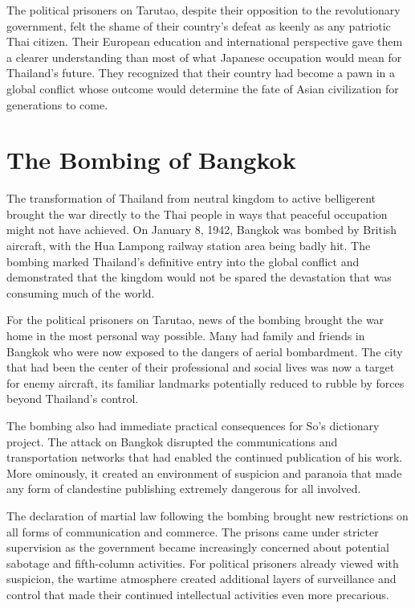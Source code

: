 \documentclass[
  Letterpaper,
]{scrbook}
\begin{document}
The political prisoners on Tarutao, despite their opposition to the
revolutionary government, felt the shame of their country's defeat as
keenly as any patriotic Thai citizen. Their European education and
international perspective gave them a clearer understanding than most of
what Japanese occupation would mean for Thailand's future. They
recognized that their country had become a pawn in a global conflict
whose outcome would determine the fate of Asian civilization for
generations to come.

\section{The Bombing of Bangkok}\label{the-bombing-of-bangkok}

The transformation of Thailand from neutral kingdom to active
belligerent brought the war directly to the Thai people in ways that
peaceful occupation might not have achieved. On January 8, 1942, Bangkok
was bombed by British aircraft, with the Hua Lampong railway station
area being badly hit. The bombing marked Thailand's definitive entry
into the global conflict and demonstrated that the kingdom would not be
spared the devastation that was consuming much of the world.

For the political prisoners on Tarutao, news of the bombing brought the
war home in the most personal way possible. Many had family and friends
in Bangkok who were now exposed to the dangers of aerial bombardment.
The city that had been the center of their professional and social lives
was now a target for enemy aircraft, its familiar landmarks potentially
reduced to rubble by forces beyond Thailand's control.

The bombing also had immediate practical consequences for So's
dictionary project. The attack on Bangkok disrupted the communications
and transportation networks that had enabled the continued publication
of his work. More ominously, it created an environment of suspicion and
paranoia that made any form of clandestine publishing extremely
dangerous for all involved.

The declaration of martial law following the bombing brought new
restrictions on all forms of communication and commerce. The prisons
came under stricter supervision as the government became increasingly
concerned about potential sabotage and fifth-column activities. For
political prisoners already viewed with suspicion, the wartime
atmosphere created additional layers of surveillance and control that
made their continued intellectual activities even more precarious.
\end{document}
